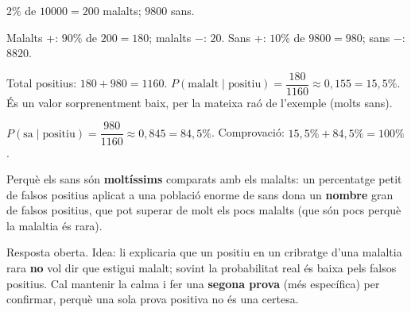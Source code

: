 \begin{solucions}
\begin{sollist}
  \item $2\%$ de $\num{10000}=200$ malalts; $\num{9800}$ sans.
  \item Malalts +: $90\%$ de $200=180$; malalts $-$: $20$. Sans +: $10\%$ de
        $\num{9800}=980$; sans $-$: $\num{8820}$.
  \item Total positius: $180+980=\num{1160}$.
        $P(\text{malalt}\mid\text{positiu})=\dfrac{180}{\num{1160}}\approx 0,155=15,5\%$.
        És un valor sorprenentment baix, per la mateixa raó de l'exemple (molts sans).
  \item $P(\text{sa}\mid\text{positiu})=\dfrac{980}{\num{1160}}\approx 0,845=84,5\%$.
        Comprovació: $15,5\%+84,5\%=100\%$.
  \item Perquè els sans són \textbf{moltíssims} comparats amb els malalts: un percentatge
        petit de falsos positius aplicat a una població enorme de sans dona un
        \textbf{nombre} gran de falsos positius, que pot superar de molt els pocs
        malalts (que són pocs perquè la malaltia és rara).
  \item Resposta oberta. Idea: li explicaria que un positiu en un cribratge d'una
        malaltia rara \textbf{no} vol dir que estigui malalt; sovint la probabilitat
        real és baixa pels falsos positius. Cal mantenir la calma i fer una \textbf{segona
        prova} (més específica) per confirmar, perquè una sola prova positiva no és una
        certesa.
\end{sollist}
\end{solucions}
